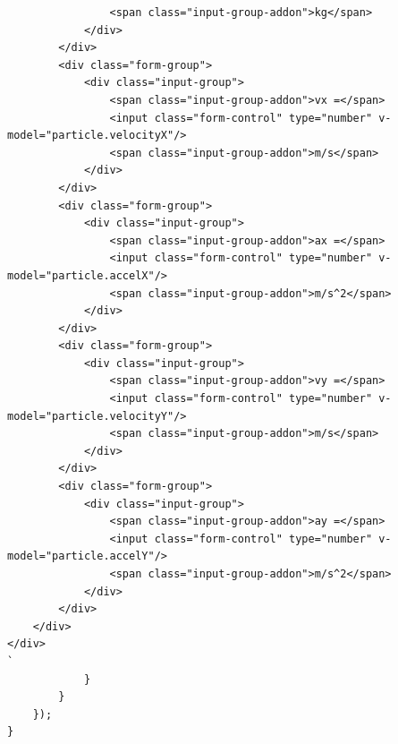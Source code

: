 \documentclass[11pt]{article}
\begin{document}
\begin{verbatim}
                <span class="input-group-addon">kg</span>
            </div>
        </div>
        <div class="form-group">
            <div class="input-group">
                <span class="input-group-addon">vx =</span>
                <input class="form-control" type="number" v-model="particle.velocityX"/>
                <span class="input-group-addon">m/s</span>
            </div>
        </div>
        <div class="form-group">
            <div class="input-group">
                <span class="input-group-addon">ax =</span>
                <input class="form-control" type="number" v-model="particle.accelX"/>
                <span class="input-group-addon">m/s^2</span>
            </div>
        </div>
        <div class="form-group">
            <div class="input-group">
                <span class="input-group-addon">vy =</span>
                <input class="form-control" type="number" v-model="particle.velocityY"/>
                <span class="input-group-addon">m/s</span>
            </div>
        </div>
        <div class="form-group">
            <div class="input-group">
                <span class="input-group-addon">ay =</span>
                <input class="form-control" type="number" v-model="particle.accelY"/>
                <span class="input-group-addon">m/s^2</span>
            </div>
        </div>
    </div>
</div>
`
            }
        }
    });
}
\end{verbatim}
\end{document}
